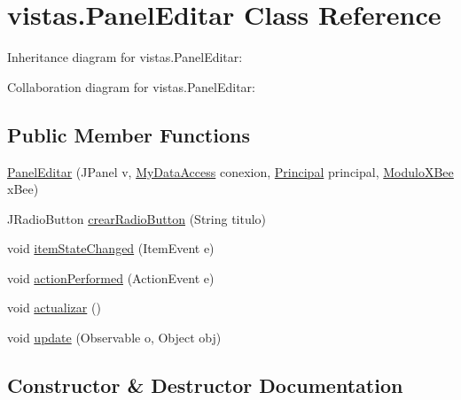 \hypertarget{classvistas_1_1_panel_editar}{}\section{vistas.\+Panel\+Editar Class Reference}
\label{classvistas_1_1_panel_editar}


Inheritance diagram for vistas.\+Panel\+Editar\+:


Collaboration diagram for vistas.\+Panel\+Editar\+:
\subsection*{Public Member Functions}
\begin{DoxyCompactItemize}
\item 
\mbox{\hyperlink{classvistas_1_1_panel_editar_aaa23e1d6431066d28fb187133a1a91e3}{Panel\+Editar}} (J\+Panel v, \mbox{\hyperlink{classconexion_s_q_l_1_1_my_data_access}{My\+Data\+Access}} conexion, \mbox{\hyperlink{classvistas_1_1_principal}{Principal}} principal, \mbox{\hyperlink{classcomunicacion_1_1_modulo_x_bee}{Modulo\+X\+Bee}} x\+Bee)
\item 
J\+Radio\+Button \mbox{\hyperlink{classvistas_1_1_panel_editar_aa4871d051f2d6dc289bc087100a49684}{crear\+Radio\+Button}} (String titulo)
\item 
void \mbox{\hyperlink{classvistas_1_1_panel_editar_ab593922475414274e7e85587fa700e48}{item\+State\+Changed}} (Item\+Event e)
\item 
void \mbox{\hyperlink{classvistas_1_1_panel_editar_abfa1e278ba63d7cf2a14c02804dcadf1}{action\+Performed}} (Action\+Event e)
\item 
void \mbox{\hyperlink{classvistas_1_1_panel_editar_a785d026660ee2531aa4fbd29d1377370}{actualizar}} ()
\item 
void \mbox{\hyperlink{classvistas_1_1_panel_editar_ae0fe6b22793a1dddd5b8003e1c245788}{update}} (Observable o, Object obj)
\end{DoxyCompactItemize}


\subsection{Constructor \& Destructor Documentation}
\mbox{\label{classvistas_1_1_panel_editar_aaa23e1d6431066d28fb187133a1a91e3}} 
